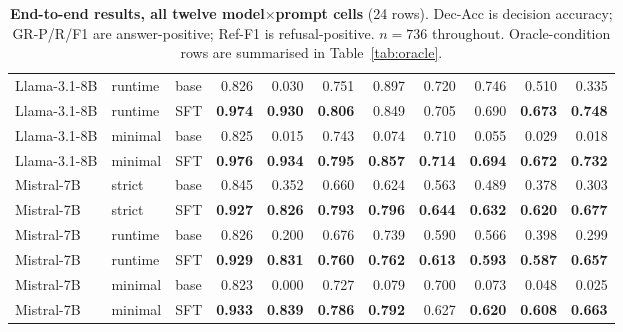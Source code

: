 \begin{table}[htbp]
{\begin{tabular*}{\linewidth}{@{\extracolsep{\fill}}lll rrrrr rrr@{}}
Llama-3.1-8B & runtime & base & 0.826 & 0.030 & 0.751 & 0.897 & 0.720 & 0.746 & 0.510 & 0.335\\
Llama-3.1-8B & runtime & SFT & \textbf{0.974} & \textbf{0.930} & \textbf{0.806} & 0.849 & 0.705 & 0.690 & \textbf{0.673} & \textbf{0.748}\\
Llama-3.1-8B & minimal & base & 0.825 & 0.015 & 0.743 & 0.074 & 0.710 & 0.055 & 0.029 & 0.018\\
Llama-3.1-8B & minimal & SFT & \textbf{0.976} & \textbf{0.934} & \textbf{0.795} & \textbf{0.857} & \textbf{0.714} & \textbf{0.694} & \textbf{0.672} & \textbf{0.732}\\
Mistral-7B & strict & base & 0.845 & 0.352 & 0.660 & 0.624 & 0.563 & 0.489 & 0.378 & 0.303\\
Mistral-7B & strict & SFT & \textbf{0.927} & \textbf{0.826} & \textbf{0.793} & \textbf{0.796} & \textbf{0.644} & \textbf{0.632} & \textbf{0.620} & \textbf{0.677}\\
Mistral-7B & runtime & base & 0.826 & 0.200 & 0.676 & 0.739 & 0.590 & 0.566 & 0.398 & 0.299\\
Mistral-7B & runtime & SFT & \textbf{0.929} & \textbf{0.831} & \textbf{0.760} & \textbf{0.762} & \textbf{0.613} & \textbf{0.593} & \textbf{0.587} & \textbf{0.657}\\
Mistral-7B & minimal & base & 0.823 & 0.000 & 0.727 & 0.079 & 0.700 & 0.073 & 0.048 & 0.025\\
Mistral-7B & minimal & SFT & \textbf{0.933} & \textbf{0.839} & \textbf{0.786} & \textbf{0.792} & 0.627 & \textbf{0.620} & \textbf{0.608} & \textbf{0.663}\\
\bottomrule\end{tabular*}}
\caption{\textbf{End-to-end results, all twelve model$\times$prompt cells} (24 rows). Dec-Acc is decision accuracy; GR-P/R/F1 are answer-positive; Ref-F1 is refusal-positive. $n=736$ throughout. Oracle-condition rows are summarised in Table~\ref{tab:oracle}.}\label{tab:full}
\end{table}
